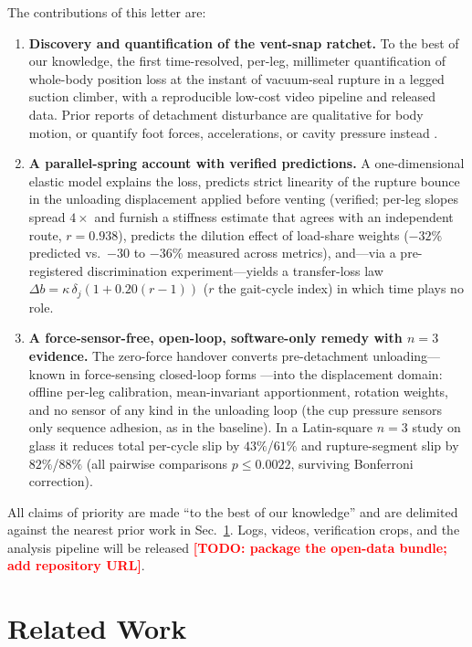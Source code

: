 \documentclass[journal]{IEEEtran}
\newcommand{\TODO}[1]{\textcolor{red}{\textbf{[TODO: #1]}}}
\begin{document}
The contributions of this letter are:
\begin{enumerate}
\item \textbf{Discovery and quantification of the vent-snap ratchet.} To
the best of our knowledge, the first time-resolved, per-leg, millimeter
quantification of whole-body position loss at the instant of vacuum-seal
rupture in a legged suction climber, with a reproducible low-cost video
pipeline and released data. Prior reports of detachment disturbance are
qualitative for body motion, or quantify foot forces, accelerations, or
cavity pressure instead \cite{kim2008smooth,pei2023review,pan2005suction}.
\item \textbf{A parallel-spring account with verified predictions.} A
one-dimensional elastic model explains the loss, predicts strict linearity of
the rupture bounce in the unloading displacement applied before venting
(verified; per-leg slopes
spread $4\times$ and furnish a stiffness estimate that agrees with an
independent route, $r=0.938$), predicts the dilution effect of load-share
weights ($-32\%$ predicted vs.\ $-30$ to $-36\%$ measured across
metrics), and---via a
pre-registered discrimination experiment---yields a transfer-loss law
$\Delta b=\kappa\,\delta_j(1+0.20(r{-}1))$ ($r$ the gait-cycle index) in
which time plays no role.
\item \textbf{A force-sensor-free, open-loop, software-only remedy
with $n{=}3$ evidence.} The zero-force handover converts pre-detachment
unloading---known in force-sensing closed-loop forms
\cite{cutkosky2010patent,nadan2024loris}---into the displacement domain:
offline per-leg calibration, mean-invariant apportionment, rotation
weights, and no sensor of any kind in the unloading loop (the cup
pressure sensors only sequence adhesion, as in the baseline). In a
Latin-square $n{=}3$
study on glass it reduces total per-cycle slip by $43\%$/$61\%$ and
rupture-segment slip by $82\%$/$88\%$ (all pairwise comparisons
$p\le0.0022$, surviving Bonferroni correction).
\end{enumerate}

All claims of priority are made ``to the best of our knowledge'' and are
delimited against the nearest prior work in
Sec.~\ref{sec:related}. Logs, videos, verification crops, and the
analysis pipeline will be released \TODO{package the open-data bundle;
add repository URL}.

\section{Related Work}
\label{sec:related}
\end{document}
